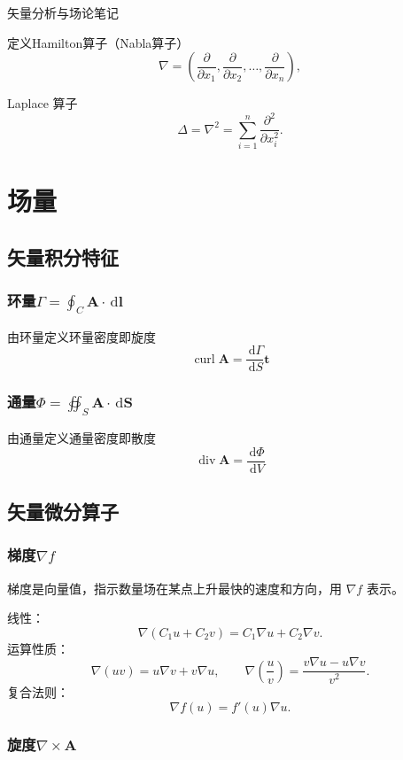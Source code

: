\documentclass[UTF8,fontset=fandol,zihao=5]{ctexart}
\newcommand{\dd}{\,\mathrm{d}}
\let\bm\boldsymbol
\begin{document}
\begin{center}
	{\heiti\headingfont{}\color{main} 矢量分析与场论笔记}
\end{center}

定义Hamilton算子（Nabla算子）
\[
\nabla=\left(\frac{\partial}{\partial x_1},
\frac{\partial}{\partial x_2},\ldots,
\frac{\partial}{\partial x_n}\right),
\]

Laplace 算子
\[
\Delta=\nabla^2=\sum_{i=1}^{n}\frac{\partial^2}{\partial x_i^2}.
\]

\section{场量}

\subsection{矢量积分特征}

\subsubsection{环量$\displaystyle\varGamma=\oint_C \bm A\cdot\dd\bm l$}

由环量定义环量密度即旋度
\[
\operatorname{curl} \bm A = \frac{\dd \varGamma}{\dd S}\mathbf{t}
\]
\subsubsection{通量$\displaystyle\varPhi=\oiint_S\bm A\cdot\dd\bm S$}

由通量定义通量密度即散度
\[
\operatorname{div} \bm A = \frac{\dd \varPhi}{\dd V}
\]

\subsection{矢量微分算子}

\subsubsection{梯度$\nabla f$}

梯度是向量值，指示数量场在某点上升最快的速度和方向，用 $\nabla f$ 表示。

线性：
\[
\nabla(C_1u+C_2v)=C_1\nabla u+C_2\nabla v.
\]
运算性质：
\[
\nabla(uv)=u\nabla v+v\nabla u,
\qquad
\nabla\left(\frac uv\right)=\frac{v\nabla u-u\nabla v}{v^2}.
\]
复合法则：
\[
\nabla f(u)=f'(u)\nabla u.
\]

\subsubsection{旋度$\nabla\times\bm A$}
\end{document}
